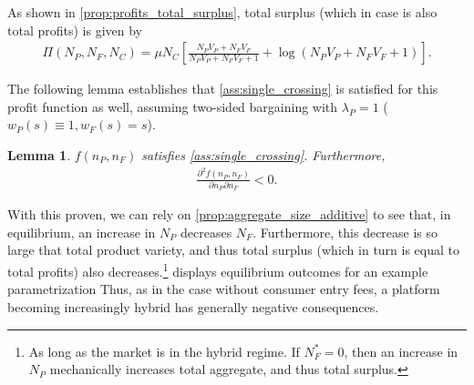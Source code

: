 \documentclass[a4paper]{article}
\newtheorem{lemma}{Lemma}
\begin{document}
As shown in \cref{prop:profits_total_surplus}, total surplus (which in case is also total profits) is given by
\begin{align*}
    \Pi(N_P, N_F, N_C) = \mu N_C \left[ \frac{N_P V_P + N_F V_F}{N_P V_P + N_F V_F + 1} + \log(N_P V_P + N_F V_F + 1) \right].
\end{align*}

The following lemma establishes that \cref{ass:single_crossing} is satisfied for this profit function as well, assuming two-sided bargaining with $\lambda_P = 1$ ($w_P(s) \equiv 1, w_F(s) = s$).
\begin{lemma}
    \label{lem:profit_assumptions_total_surplus}
    $f(n_P, n_F)$ satisfies \cref{ass:single_crossing}.
    Furthermore,
    \begin{align*}
        \frac{\partial^2 f(n_P, n_F)}{\partial n_P \partial n_F} < 0.
    \end{align*}
\end{lemma}

With this proven, we can rely on \cref{prop:aggregate_size_additive} to see that, in equilibrium, an increase in $N_P$ decreases $N_F$.
Furthermore, this decrease is so large that total product variety, and thus total surplus (which in turn is equal to total profits) also decreases.\footnote{
    As long as the market is in the hybrid regime.
    If $N_F^* = 0$, then an increase in $N_P$ mechanically increases total aggregate, and thus total surplus.
}
 displays equilibrium outcomes for an example parametrization
Thus, as in the case without consumer entry fees, a platform becoming increasingly hybrid has generally negative consequences.
\end{document}
